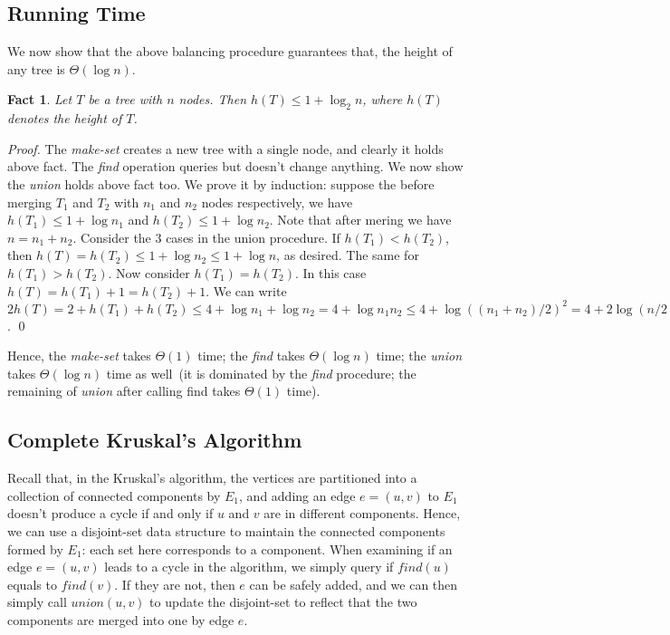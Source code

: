 \documentclass[letterpaper,11pt]{article}
\theoremstyle{mytheorem}
\newtheorem{fact}{Fact}
\begin{document}
\subsection*{Running Time}

We now show that the above balancing procedure guarantees
that, the height of any tree is $\Theta(\log n)$. 
\begin{fact}
Let $T$ be a tree with $n$ nodes. Then $h(T) \le 1 + \log_2 n$, where $h(T)$ denotes the height of $T$.
\end{fact}
\emph{Proof.} The \emph{make-set} creates a new tree with a single node, and clearly it holds above fact.
The \emph{find} operation queries but doesn't change anything. We now show the \emph{union}
holds above fact too. We prove it by induction: suppose the before merging $T_1$ and $T_2$
with $n_1$ and $n_2$ nodes respectively, we have $h(T_1) \le 1 + \log n_1$ and $h(T_2) \le 1 + \log n_2$.
Note that after mering we have $n = n_1 + n_2$.
Consider the 3 cases in the union procedure. 
If $h(T_1) < h(T_2)$, then $h(T) = h(T_2) \le 1 + \log n_2 \le 1 + \log n$, as desired.
The same for $h(T_1) > h(T_2)$. Now consider $h(T_1) = h(T_2)$.
In this case $h(T) = h(T_1) + 1 = h(T_2) + 1$.
We can write $2h(T) = 2 + h(T_1) + h(T_2) \le 4 + \log n_1 + \log n_2 = 4 + \log n_1n_2 \le 4 + \log((n_1+n_2)/2)^2 = 4 + 2\log (n/2) = 2(1+\log n)$.  \qed

Hence, the \emph{make-set} takes $\Theta(1)$ time;
the \emph{find} takes $\Theta(\log n)$ time;
the \emph{union} takes $\Theta(\log n)$ time as well~(it is dominated by the \emph{find} procedure; the remaining of \emph{union}
after calling find takes $\Theta(1)$ time).

\subsection*{Complete Kruskal's Algorithm}

Recall that, in the Kruskal's algorithm, the vertices are partitioned
into a collection of connected components by $E_1$,
and adding an edge $e = (u,v)$ to $E_1$ doesn't produce a cycle
if and only if $u$ and $v$ are in different components.
Hence, we can use a disjoint-set data structure
to maintain the connected components formed by $E_1$: 
each set here corresponds to a component.
When examining if an edge $e=(u,v)$ leads to a cycle in the algorithm,
we simply query if $find(u)$ equals to $find(v)$.
If they are not, then $e$ can be safely added,
and we can then simply call $union(u,v)$ to update the
disjoint-set to reflect that the two components are merged into one
by edge $e$.
\end{document}
